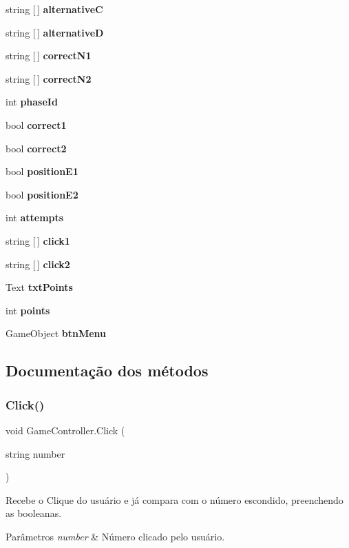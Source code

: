 \begin{DoxyCompactItemize}
\item 
string [$\,$] \textbf{ alternativeC}
\item 
string [$\,$] \textbf{ alternativeD}
\item 
string [$\,$] \textbf{ correct\+N1}
\item 
string [$\,$] \textbf{ correct\+N2}
\item 
int \textbf{ phase\+Id}
\item 
bool \textbf{ correct1}
\item 
bool \textbf{ correct2}
\item 
bool \textbf{ position\+E1}
\item 
bool \textbf{ position\+E2}
\item 
int \textbf{ attempts}
\item 
string [$\,$] \textbf{ click1}
\item 
string [$\,$] \textbf{ click2}
\item 
Text \textbf{ txt\+Points}
\item 
int \textbf{ points}
\item 
Game\+Object \textbf{ btn\+Menu}
\end{DoxyCompactItemize}


\subsection{Documentação dos métodos}
\mbox{\label{class_game_controller_a68f7c3a2a7630e12e04de89b4a6d0d2d}} 
\subsubsection{Click()}
{\footnotesize\ttfamily void Game\+Controller.\+Click (\begin{DoxyParamCaption}\item[{string}]{number }\end{DoxyParamCaption})}



Recebe o Clique do usuário e já compara com o número escondido, preenchendo as booleanas. 


\begin{DoxyParams}{Parâmetros}
{\em number} & Número clicado pelo usuário.\\
\hline
\end{DoxyParams}
\mbox{\label{class_game_controller_a67f2b0ef6aad12da8f8c2911577e750d}} 
